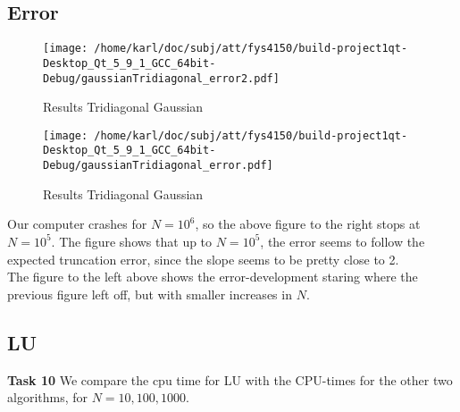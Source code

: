 \documentclass{article}
\begin{document}
\begin{minipage}{.49\textwidth} %
	
\end{minipage}\hfill
\begin{minipage}{.49\textwidth}
	
\end{minipage}\hfill



\subsection{Error}
\begin{minipage}{.49\textwidth} %
\begin{figure}[H]
	\centering
	\texttt{[image: /home/karl/doc/subj/att/fys4150/build-project1qt-Desktop\_Qt\_5\_9\_1\_GCC\_64bit-Debug/gaussianTridiagonal\_error2.pdf]}
	\caption{Results Tridiagonal Gaussian}
\end{figure}
\end{minipage}\hfill
\begin{minipage}{.49\textwidth}
\begin{figure}[H]
	\centering
	\texttt{[image: /home/karl/doc/subj/att/fys4150/build-project1qt-Desktop\_Qt\_5\_9\_1\_GCC\_64bit-Debug/gaussianTridiagonal\_error.pdf]}
	\caption{Results Tridiagonal Gaussian}
\end{figure}

\end{minipage}\hfill




Our computer crashes for $N = 10^6$, so the above figure to the right stops at $N = 10^5$. The figure shows that up to $N = 10^5$, the error seems to follow the expected truncation error, since the slope seems to be pretty close to 2.\\

The figure to the left above shows the error-development staring where the previous figure left off, but with smaller increases in $N$.


\subsection{LU}
\textbf{Task 10} We compare the cpu time for LU with the CPU-times for the other two algorithms, for $N=10, 100, 1000$. \\
\end{document}
